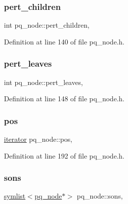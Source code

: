 \subsubsection{\texorpdfstring{pert\+\_\+children}{pert\_children}}
{\footnotesize\ttfamily int pq\+\_\+node\+::pert\+\_\+children\hspace{0.3cm}{\ttfamily [protected]}, {\ttfamily [inherited]}}



Definition at line 140 of file pq\+\_\+node.\+h.

\mbox{\label{classpq__node_a3fb78609f93f41efd6826ed3169fc312}} 
\subsubsection{\texorpdfstring{pert\+\_\+leaves}{pert\_leaves}}
{\footnotesize\ttfamily int pq\+\_\+node\+::pert\+\_\+leaves\hspace{0.3cm}{\ttfamily [protected]}, {\ttfamily [inherited]}}



Definition at line 148 of file pq\+\_\+node.\+h.

\mbox{\label{classpq__node_a5e8a5defa0fec4ff2e82fabee97296b4}} 
\subsubsection{\texorpdfstring{pos}{pos}}
{\footnotesize\ttfamily \mbox{\hyperlink{classpq__node_a34898c9eb1527787c07e8ebefd6bfba5}{iterator}} pq\+\_\+node\+::pos\hspace{0.3cm}{\ttfamily [protected]}, {\ttfamily [inherited]}}



Definition at line 192 of file pq\+\_\+node.\+h.

\mbox{\label{classpq__node_a2cc030cfa4560872acea8b50ebd0542b}} 
\subsubsection{\texorpdfstring{sons}{sons}}
{\footnotesize\ttfamily \mbox{\hyperlink{classsymlist}{symlist}}$<$\mbox{\hyperlink{classpq__node}{pq\+\_\+node}}$\ast$$>$ pq\+\_\+node\+::sons\hspace{0.3cm}{\ttfamily [protected]}, {\ttfamily [inherited]}}



